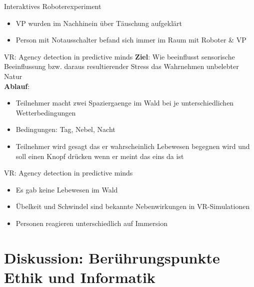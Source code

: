 \documentclass[10pt]{beamer}
\begin{document}
	\begin{frame}{Interaktives Roboterexperiment}

		\begin{itemize}
			\item VP wurden im Nachhinein über Täuschung aufgeklärt
			\item Person mit Notausschalter befand sich immer im Raum mit Roboter \& VP
		\end{itemize}
	\end{frame}
	
	\begin{frame}{VR: Agency detection in predictive minds}
		\textbf{Ziel}: Wie beeinflusst sensorische Beeinflussung bzw. daraus resultierender Stress das Wahrnehmen unbelebter Natur \\
		\textbf{Ablauf}:
		\begin{itemize}
		\item Teilnehmer macht zwei Spaziergaenge im Wald bei je unterschiedlichen Wetterbedingungen
		\item Bedingungen: Tag, Nebel, Nacht
		\item Teilnehmer wird gesagt das er wahrscheinlich Lebewesen begegnen wird und soll einen Knopf drücken wenn er meint das eins da ist
		\end{itemize}
	\end{frame}
	
	
	\begin{frame}{VR: Agency detection in predictive minds}
		
		\begin{itemize}
			\item Es gab keine Lebewesen im Wald
			\item Übelkeit und Schwindel sind bekannte Nebenwirkungen in VR-Simulationen
			\item Personen reagieren unterschiedlich auf Immersion
		\end{itemize}
		
	\end{frame}

\section{Diskussion: Berührungspunkte Ethik und Informatik}
\end{document}
